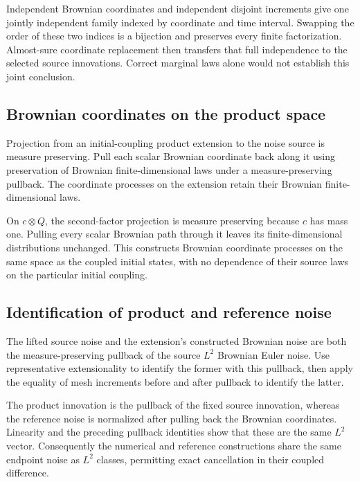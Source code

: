 \documentclass[11pt,a4paper]{article}
\begin{document}
Independent Brownian coordinates and independent disjoint increments give one jointly independent family indexed by coordinate and time interval. Swapping the order of these two indices is a bijection and preserves every finite factorization. Almost-sure coordinate replacement then transfers that full independence to the selected source innovations. Correct marginal laws alone would not establish this joint conclusion.


\subsection{\texorpdfstring{Brownian coordinates on the product space}{Brownian coordinates on the product space}}


Projection from an initial-coupling product extension to the noise source is measure preserving. Pull each scalar Brownian coordinate back along it using preservation of Brownian finite-dimensional laws under a measure-preserving pullback. The coordinate processes on the extension retain their Brownian finite-dimensional laws.



On \(c\otimes Q\), the second-factor projection is measure preserving because \(c\) has mass one. Pulling every scalar Brownian path through it leaves its finite-dimensional distributions unchanged. This constructs Brownian coordinate processes on the same space as the coupled initial states, with no dependence of their source laws on the particular initial coupling.


\subsection{\texorpdfstring{Identification of product and reference noise}{Identification of product and reference noise}}


The lifted source noise and the extension's constructed Brownian noise are both the measure-preserving pullback of the source \(L^2\) Brownian Euler noise. Use representative extensionality to identify the former with this pullback, then apply the equality of mesh increments before and after pullback to identify the latter.



The product innovation is the pullback of the fixed source innovation, whereas the reference noise is normalized after pulling back the Brownian coordinates. Linearity and the preceding pullback identities show that these are the same \(L^2\) vector. Consequently the numerical and reference constructions share the same endpoint noise as \(L^2\) classes, permitting exact cancellation in their coupled difference.
\end{document}
